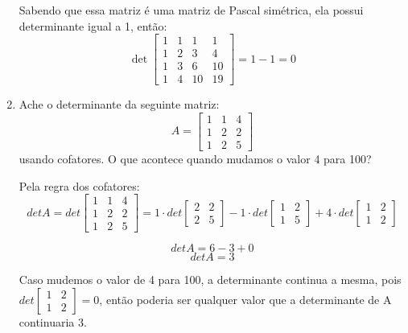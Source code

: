 \documentclass[leqno]{article}
\numberwithin{equation}{section}
\begin{document}
\begin{enumerate}
\begin{sol}
		Sabendo que essa matriz é uma matriz de Pascal simétrica, ela possui determinante igual a 1, então:
		$$\det \begin{bmatrix}
			1 & 1 & 1 & 1 \\
			1 & 2 & 3 & 4 \\
			1 & 3 & 6 & 10 \\
			1 & 4 & 10 & 19
		\end{bmatrix} = 1 - 1 = 0$$
		\end{sol}
		
		
		\item Ache o determinante da seguinte matriz:
		$$A = \begin{bmatrix} 1 & 1 & 4 \\ 1 & 2 & 2 \\ 1 & 2 & 5   \end{bmatrix}$$
		usando cofatores. O que acontece quando mudamos o valor 4 para 100?
		
		\begin{sol}
			Pela regra dos cofatores:\\
			$$
			detA = det\begin{bmatrix}
			 1 & 1 & 4 \\
			 1 & 2 & 2 \\ 
			 1 & 2 & 5
		    \end{bmatrix} = 
	    	1 \cdot det\begin{bmatrix}
	    		2 & 2 \\
	    		2 & 5
	    	\end{bmatrix}
			- 1 \cdot det\begin{bmatrix}
				1 & 2 \\
				1 & 5
			\end{bmatrix}
			 + 4 \cdot det\begin{bmatrix}
			 	1 & 2 \\
			 	1 & 2
			 \end{bmatrix}$$
		 
		 $$detA = 6 - 3 + 0$$
		 $$detA = 3$$
		 
		 Caso mudemos o valor de 4 para 100, a determinante continua a mesma, pois $det\begin{bmatrix}
		 	1 & 2 \\
		 	1 & 2
		 \end{bmatrix} = 0$, então poderia ser qualquer valor que a determinante de A continuaria 3.  
		\end{sol}
		
	\end{enumerate}
\end{document}
